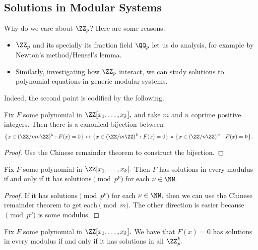 \subsection{Solutions in Modular Systems}
Why do we care about $\ZZ_p$? Here are some reasons.
\begin{itemize}
	\item $\ZZ_p$ and its specially its fraction field $\QQ_p$ let us do analysis, for example by Newton's method/Hensel's lemma.
	\item Similarly, investigating how $\ZZ_p$ interact, we can study solutions to polynomial equations in generic modular systems.
\end{itemize}
Indeed, the second point is codified by the following.
\begin{proposition}
	Fix $F$ some polynomial in $\ZZ[x_1,\ldots,x_k],$ and take $m$ and $n$ coprime positive integers. Then there is a canonical bijection between
	\[\left\{x\in(\ZZ/mn\ZZ)^k:F(x)=0\right\}\leftrightarrow\left\{x\in(\ZZ/m\ZZ)^k:F(x)=0\right\}\times\left\{x\in(\ZZ/n\ZZ)^\times:F(x)=0\right\}.\]
\end{proposition}
\begin{proof}
	Use the Chinese remainder theorem to construct the bijection.
\end{proof}
\begin{corollary}
	Fix $F$ some polynomial in $\ZZ[x_1,\ldots,x_k].$ Then $F$ has solutions in every modulus if and only if it has solutions$\pmod{p^\nu}$ for each $\nu\in\NN.$
\end{corollary}
\begin{proof}
	If it has solutions$\pmod{p^\nu}$ for each $\nu\in\NN,$ then we can use the Chinese remainder theorem to get each$\pmod m.$ The other direction is easier because$\pmod{p^\nu}$ is some modulus.
\end{proof}
\begin{prop}
	Fix $F$ some polynomial in $\ZZ[x_1,\ldots,x_k].$ We have that $F(x)=0$ has solutions in every modulus if and only if it has solutions in all $\ZZ_p^k.$
\end{prop}
